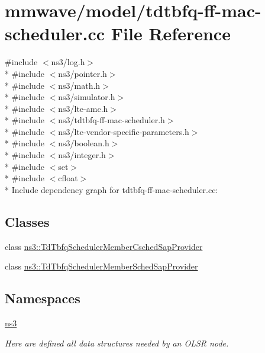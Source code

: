 \hypertarget{mmwave_2model_2tdtbfq-ff-mac-scheduler_8cc}{}\section{mmwave/model/tdtbfq-\/ff-\/mac-\/scheduler.cc File Reference}
\label{mmwave_2model_2tdtbfq-ff-mac-scheduler_8cc}
{\ttfamily \#include $<$ns3/log.\+h$>$}\\*
{\ttfamily \#include $<$ns3/pointer.\+h$>$}\\*
{\ttfamily \#include $<$ns3/math.\+h$>$}\\*
{\ttfamily \#include $<$ns3/simulator.\+h$>$}\\*
{\ttfamily \#include $<$ns3/lte-\/amc.\+h$>$}\\*
{\ttfamily \#include $<$ns3/tdtbfq-\/ff-\/mac-\/scheduler.\+h$>$}\\*
{\ttfamily \#include $<$ns3/lte-\/vendor-\/specific-\/parameters.\+h$>$}\\*
{\ttfamily \#include $<$ns3/boolean.\+h$>$}\\*
{\ttfamily \#include $<$ns3/integer.\+h$>$}\\*
{\ttfamily \#include $<$set$>$}\\*
{\ttfamily \#include $<$cfloat$>$}\\*
Include dependency graph for tdtbfq-\/ff-\/mac-\/scheduler.cc\+:
\subsection*{Classes}
\begin{DoxyCompactItemize}
\item 
class \hyperlink{classns3_1_1TdTbfqSchedulerMemberCschedSapProvider}{ns3\+::\+Td\+Tbfq\+Scheduler\+Member\+Csched\+Sap\+Provider}
\item 
class \hyperlink{classns3_1_1TdTbfqSchedulerMemberSchedSapProvider}{ns3\+::\+Td\+Tbfq\+Scheduler\+Member\+Sched\+Sap\+Provider}
\end{DoxyCompactItemize}
\subsection*{Namespaces}
\begin{DoxyCompactItemize}
\item 
 \hyperlink{namespacens3}{ns3}
\begin{DoxyCompactList}\small\item\em Here are defined all data structures needed by an O\+L\+SR node. \end{DoxyCompactList}\end{DoxyCompactItemize}
